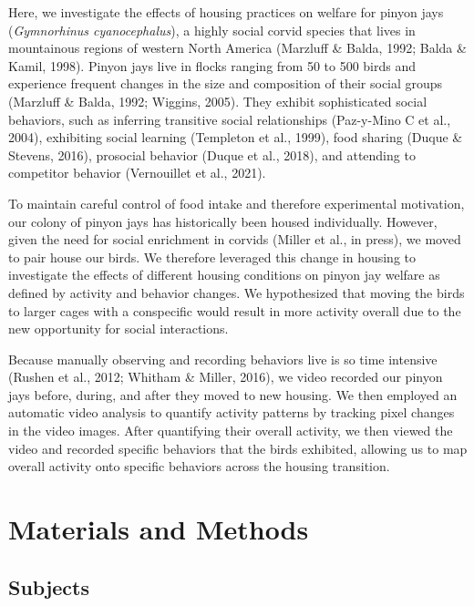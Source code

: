 \documentclass[
  pub]{apa6}
\begin{document}
Here, we investigate the effects of housing practices on welfare for pinyon jays (\emph{Gymnorhinus cyanocephalus}), a highly social corvid species that lives in mountainous regions of western North America (Marzluff \& Balda, 1992; Balda \& Kamil, 1998). Pinyon jays live in flocks ranging from 50 to 500 birds and experience frequent changes in the size and composition of their social groups (Marzluff \& Balda, 1992; Wiggins, 2005). They exhibit sophisticated social behaviors, such as inferring transitive social relationships (Paz-y-Mino C et al., 2004), exhibiting social learning (Templeton et al., 1999), food sharing (Duque \& Stevens, 2016), prosocial behavior (Duque et al., 2018), and attending to competitor behavior (Vernouillet et al., 2021).

To maintain careful control of food intake and therefore experimental motivation, our colony of pinyon jays has historically been housed individually. However, given the need for social enrichment in corvids (Miller et al., in press), we moved to pair house our birds. We therefore leveraged this change in housing to investigate the effects of different housing conditions on pinyon jay welfare as defined by activity and behavior changes. We hypothesized that moving the birds to larger cages with a conspecific would result in more activity overall due to the new opportunity for social interactions.

Because manually observing and recording behaviors live is so time intensive (Rushen et al., 2012; Whitham \& Miller, 2016), we video recorded our pinyon jays before, during, and after they moved to new housing. We then employed an automatic video analysis to quantify activity patterns by tracking pixel changes in the video images. After quantifying their overall activity, we then viewed the video and recorded specific behaviors that the birds exhibited, allowing us to map overall activity onto specific behaviors across the housing transition.

\hypertarget{materials-and-methods}{%
\section{Materials and Methods}\label{materials-and-methods}}

\hypertarget{subjects}{%
\subsection{Subjects}\label{subjects}}
\end{document}
